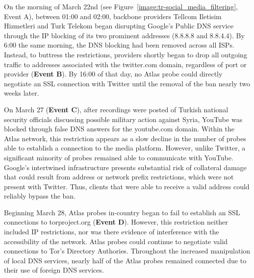 On the morning of March 22nd (see Figure~\ref{image:tr-social_media_filtering},
Event A), between 01:00 and 02:00, backbone providers Tellcom Iletisim
Hizmetleri and Turk Telekom began disrupting Google's Public DNS service
through the IP blocking of its two prominent addresses (8.8.8.8 and 8.8.4.4).
By 6:00 the same morning, the DNS blocking had been removed across all ISPs.
Instead, to buttress the restrictions, providers shortly began to drop all
outgoing traffic to addresses associated with the twitter.com domain,
regardless of port or provider (\textbf{Event B}). By 16:00 of that
day, no Atlas probe could directly negotiate an SSL connection with Twitter
until the removal of the ban nearly two weeks later.

On March 27 (\textbf{Event C}), after recordings were posted of Turkish
national security officials discussing possible military action against Syria,
YouTube was blocked through false DNS answers for the youtube.com domain.
Within the Atlas network, this restriction appears as a slow decline in the
number of probes able to establish a connection to the media platform. However, unlike Twitter, a
significant minority of probes remained able to communicate with YouTube.
Google's intertwined infrastructure presents substantial risk of collateral damage that could result from address or network prefix restrictions, which were not
present with Twitter. Thus, clients that were able to receive a valid address could reliably bypass the ban.

Beginning
March 28, Atlas probes in-country began to fail to establish an SSL
connections to torproject.org (\textbf{Event D}). However, this restriction
neither included IP restrictions, nor was there evidence of interference with
the accessibility of the network. Atlas probes could continue to negotiate
valid connections to Tor's Directory Authories. Throughout the increased
manipulation of local DNS services, nearly half of the Atlas probes remained
connected due to their use of foreign DNS services.

